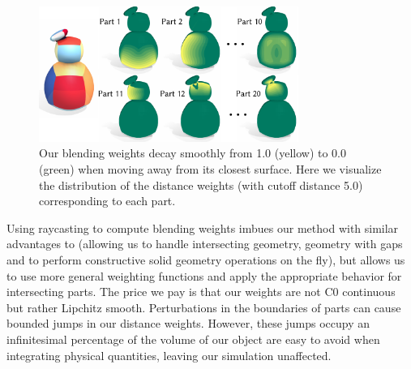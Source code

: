 \begin{figure}[h]
    \centering
    \includegraphics[width=3.33in]{figures/distance_weight_puft.pdf}
    \caption{Our blending weights decay smoothly from 1.0 (yellow) to 0.0 (green) when moving away from its closest surface. Here we visualize the distribution of the distance weights (with cutoff distance 5.0) corresponding to each part.   
    }
    \label{fig:distance_weight_puft}
    \vspace{-5pt}
  \end{figure} 

Using raycasting to compute blending weights imbues our method with similar advantages to \citet{Sawhney:2020:MCG} (allowing us to 
handle intersecting geometry, geometry with gaps and to perform constructive solid geometry operations on the fly),
but allows us to use more general weighting functions and apply the appropriate behavior for intersecting parts.
The price we pay is that our weights are not C0 continuous but rather Lipchitz smooth.
Perturbations in the boundaries of parts can cause bounded jumps in our distance weights. 
However, these jumps occupy an infinitesimal percentage of the volume of our object are easy to avoid when integrating
physical quantities, leaving our simulation unaffected. 

